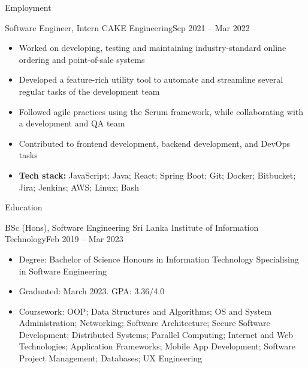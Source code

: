 \documentclass[garamond, a4paper]{modest-cv}
\begin{document}
	\makeheader

	\begin{cvsection}{Employment}
		\begin{cvsubsection}[2]{Software Engineer, Intern }{CAKE Engineering}{Sep 2021 -- Mar 2022 }
			\begin{itemize}
				\item Worked on developing, testing and maintaining industry-standard online ordering and point-of-sale systems
				\item Developed a feature-rich utility tool to automate and streamline several regular tasks of the development team
				\item Followed agile practices using the Scrum framework, while collaborating with a development and QA team
				\item Contributed to frontend development, backend development, and DevOps tasks
				\item \textbf{Tech stack:} JavaScript; Java; React; Spring Boot; Git; Docker; Bitbucket; Jira; Jenkins; AWS; Linux; Bash
			\end{itemize}
		\end{cvsubsection}
	\end{cvsection}

	\begin{cvsection}{Education}
		\begin{cvsubsection}[2]{BSc (Hons), Software Engineering }{Sri Lanka Institute of \linebreak Information Technology}{Feb 2019 -- Mar 2023 }
			\begin{itemize}
				\item Degree: Bachelor of Science Honours in Information Technology Specialising in Software Engineering
				\item Graduated: March 2023. GPA: 3.36/4.0
				\item Coursework: OOP; Data Structures and Algorithms; OS and System Administration; Networking; Software Architecture; Secure Software Development; Distributed Systems; Parallel Computing; Internet and Web Technologies; Application Frameworks; Mobile App Development; Software Project Management; Databases; UX Engineering
			\end{itemize}
		\end{cvsubsection}
	\end{cvsection}
\end{document}

